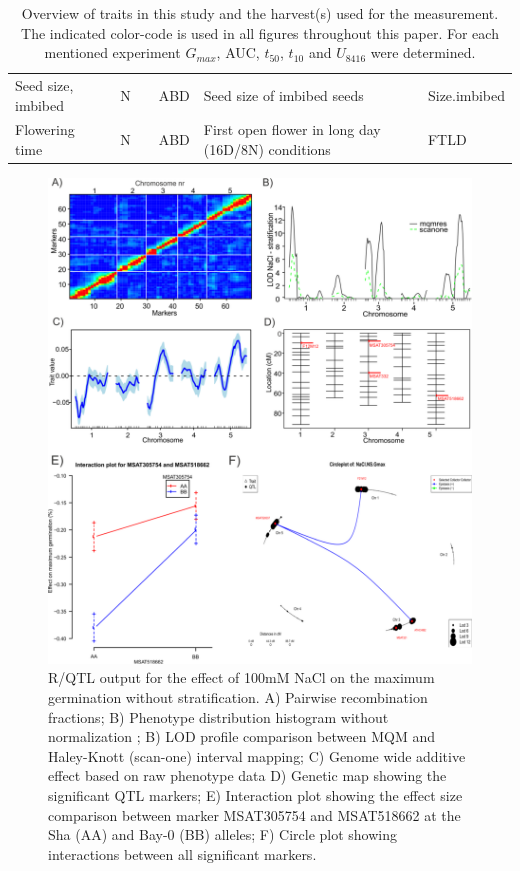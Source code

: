 \begin{table}[h]
\begin{tabular}{ | l | c | l | l | p{4cm} | l | }
    Seed size, imbibed        & N & \cellcolor{C20} & ABD           & Seed size of imbibed seeds                                                                                               & Size.imbibed              \\
    Flowering time            & N & \cellcolor{C21} & ABD           & First open flower in long day (16D/8N) conditions                                                                        & FTLD                      \\
    \hline
  \end{tabular}
  \caption[Trait codes]{Overview of traits in this study and the harvest(s) used for the measurement. The indicated color-code 
          is used in all figures throughout this paper. For each mentioned experiment $G_{max}$, AUC, $t_{50}$, $t_{10}$ and $U_{8416}$ were determined.}
  \label{table:codes}
\end{table}

\begin{figure}[h!]
  \centering
  \includegraphics[keepaspectratio,scale=0.30]{eps/image_3_1_2.eps}
  \caption[Generated Output.]{R/QTL output for the effect of 100mM NaCl on the maximum germination without 
          stratification. A) Pairwise recombination fractions; B) Phenotype distribution histogram without 
          normalization ; B) LOD profile comparison between MQM and Haley-Knott (scan-one) interval mapping; 
          C) Genome wide additive effect based on raw phenotype data D) Genetic map showing the significant 
          QTL markers; E) Interaction plot showing the effect size comparison between marker MSAT305754 and 
          MSAT518662 at the Sha (AA) and Bay-0 (BB) alleles; F) Circle plot showing interactions between 
          all significant markers.}
          \label{fig:generatedoutput}
\end{figure}

